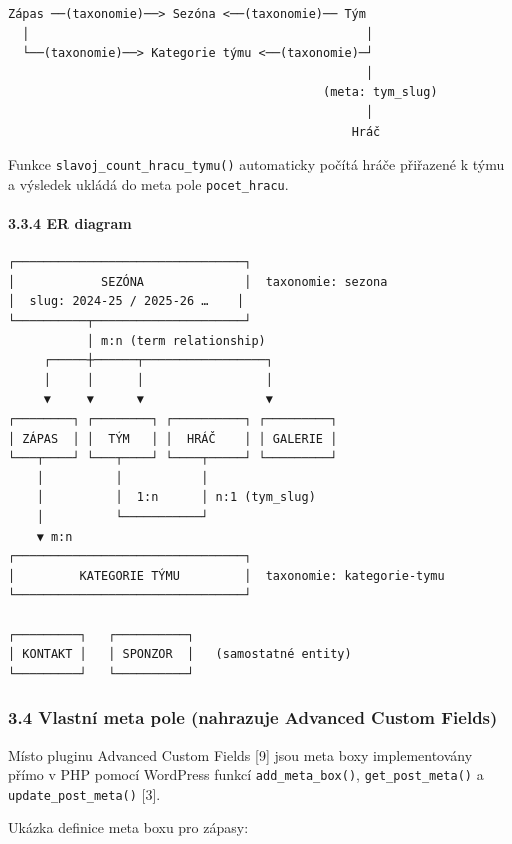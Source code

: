 \begin{verbatim}
Zápas ──(taxonomie)──> Sezóna <──(taxonomie)── Tým
  │                                               │
  └──(taxonomie)──> Kategorie týmu <──(taxonomie)─┘
                                                  │
                                            (meta: tym_slug)
                                                  │
                                                Hráč
\end{verbatim}

Funkce \texttt{slavoj\_count\_hracu\_tymu()} automaticky počítá hráče
přiřazené k týmu a výsledek ukládá do meta pole \texttt{pocet\_hracu}.

\paragraph{3.3.4 ER diagram}\label{er-diagram}

\begin{verbatim}
┌────────────────────────────────┐
│            SEZÓNA              │  taxonomie: sezona
│  slug: 2024-25 / 2025-26 …    │
└──────────┬─────────────────────┘
           │ m:n (term relationship)
     ┌─────┼──────┬─────────────────┐
     │     │      │                 │
     ▼     ▼      ▼                 ▼
┌────────┐ ┌────────┐ ┌──────────┐ ┌─────────┐
│ ZÁPAS  │ │  TÝM   │ │  HRÁČ    │ │ GALERIE │
└───┬────┘ └───┬────┘ └────┬─────┘ └─────────┘
    │          │           │
    │          │  1:n      │ n:1 (tym_slug)
    │          └───────────┘
    ▼ m:n
┌────────────────────────────────┐
│         KATEGORIE TÝMU         │  taxonomie: kategorie-tymu
└────────────────────────────────┘

┌─────────┐   ┌──────────┐
│ KONTAKT │   │ SPONZOR  │   (samostatné entity)
└─────────┘   └──────────┘
\end{verbatim}

\subsubsection{3.4 Vlastní meta pole (nahrazuje Advanced Custom
Fields)}\label{vlastnuxed-meta-pole-nahrazuje-advanced-custom-fields}

Místo pluginu Advanced Custom Fields {[}9{]} jsou meta boxy
implementovány přímo v PHP pomocí WordPress funkcí
\texttt{add\_meta\_box()}, \texttt{get\_post\_meta()} a
\texttt{update\_post\_meta()} {[}3{]}.

Ukázka definice meta boxu pro zápasy:

